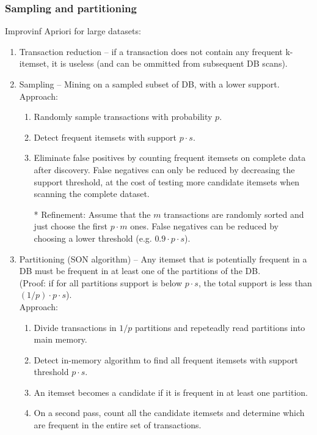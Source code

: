   \subsubsection{Sampling and partitioning} %
  \label{ssub:partitioning}
    Improvinf Apriori for large datasets:
    \begin{enumerate}
      \item Transaction reduction -- if a transaction does not contain any frequent k-itemset, it is useless (and can be ommitted from subsequent DB scans).
      \item Sampling -- Mining on a sampled subset of DB, with a lower support. Approach:
      \begin{enumerate}
        \item Randomly sample transactions with probability $p$.
        \item Detect frequent itemsets with support $p\cdot s$.
        \item Eliminate false positives by counting frequent itemsets on complete data after discovery. False negatives can only be reduced by decreasing the support threshold, at the cost of testing more candidate itemsets when scanning the complete dataset.
        \item[*] Refinement: Assume that the $m$ transactions are randomly sorted and just choose the first $p\cdot m$ ones. False negatives can be reduced by choosing a lower threshold (e.g. $0.9\cdot p \cdot s$).
      \end{enumerate}
      \item Partitioning (SON algorithm) -- Any itemset that is potentially frequent in a DB must be frequent in at least one of the partitions of the DB.\\
      (Proof: if for all partitions support is below $p\cdot s$, the total support is less than $(1/p)\cdot p\cdot s$).\\
      Approach:
      \begin{enumerate}
        \item Divide transactions in $1/p$ partitions and repeteadly read partitions into main memory.
        \item Detect in-memory algorithm to find all frequent itemsets with support threshold $p\cdot s$.
        \item An itemset becomes a candidate if it is frequent in at least one partition.
        \item On a second pass, count all the candidate itemsets and determine which are frequent in the entire set of transactions.
      \end{enumerate}
    \end{enumerate}

